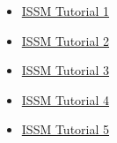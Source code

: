 %
%
%
%

\begin{itemize}
	\item \href{https://youtu.be/a7WorVjnYZc}{ISSM Tutorial 1}
	\item \href{https://youtu.be/2kTncXsoGPQ}{ISSM Tutorial 2}
	\item \href{https://youtu.be/0g1atAnw104}{ISSM Tutorial 3}
	\item \href{https://youtu.be/KtpBtioOW1E}{ISSM Tutorial 4}
	\item \href{https://youtu.be/iFHdMozWzm0}{ISSM Tutorial 5}
\end{itemize}

\clearpage %
